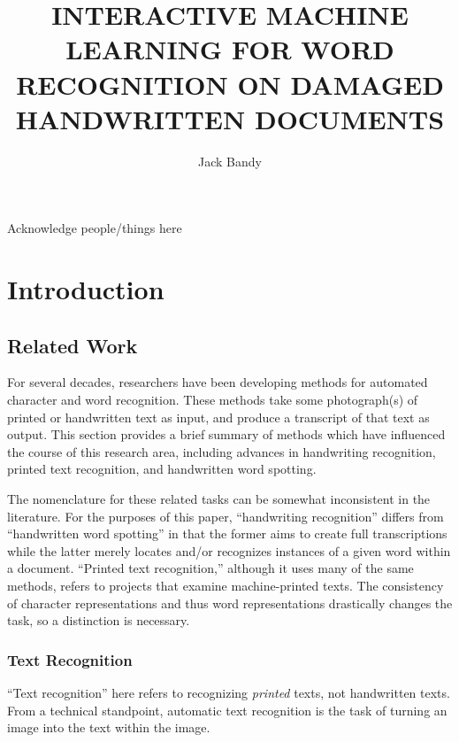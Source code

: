 \documentclass[final]{ukthesis}
\begin{document}
\author{Jack Bandy}
\title{INTERACTIVE MACHINE LEARNING FOR WORD RECOGNITION ON DAMAGED HANDWRITTEN DOCUMENTS}
\frontmatter
\maketitle
\begin{acknowledgments}
Acknowledge people/things here
\end{acknowledgments}
\tableofcontents\clearpage
\listoffigures\clearpage
\listoftables\clearpage
\mainmatter


%
%
%
\chapter{Introduction}


%
%
\section{Related Work}
For several decades, researchers have been developing methods for automated character and word recognition. These methods take some photograph(s) of printed or handwritten text as input, and produce a transcript of that text as output. This section provides a brief summary of methods which have influenced the course of this research area, including advances in handwriting recognition, printed text recognition, and handwritten word spotting.

The nomenclature for these related tasks can be somewhat inconsistent in the literature. For the purposes of this paper, ``handwriting recognition'' differs from ``handwritten word spotting'' in that the former aims to create full transcriptions while the latter merely locates and/or recognizes instances of a given word within a document. ``Printed text recognition,'' although it uses many of the same methods, refers to projects that examine machine-printed texts. The consistency of character representations and thus word representations drastically changes the task, so a distinction is necessary.

\subsection{Text Recognition}
``Text recognition'' here refers to recognizing {\em printed} texts, not handwritten texts. From a technical standpoint, automatic text recognition is the task of turning an image into the text within the image.
\end{document}
